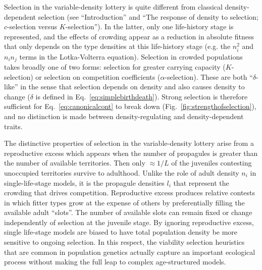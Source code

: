 \documentclass[12pt]{article}
\begin{document}
Selection in the variable-density lottery is quite different from classical density-dependent selection (see ``Introduction'' and ``The response of density to selection; $c$-selection versus $K$-selection''). In the latter, only one life-history stage is represented, and the effects of crowding appear as a reduction in absolute fitness that only depends on the type densities at this life-history stage (e.g. the $n_i^2$ and $n_in_j$ terms in the Lotka-Volterra equation). Selection in crowded populations takes broadly one of two forms: selection for greater carrying capacity ($K$-selection) or selection on competition coefficients ($\alpha$-selection). These are both ``$\delta$-like''  in the sense that selection depends on density and also causes density to change ($\delta$ is defined in Eq.~\eqref{eq:simplebirthdeath}). Strong selection is therefore sufficient for Eq.~\eqref{eq:canonicalcont} to break down (Fig.~\ref{fig:strengthofselection}), and no distinction is made between density-regulating and density-dependent traits.

The distinctive properties of selection in the variable-density lottery arise from a reproductive excess which appears when the number of propagules is greater than the number of available territories. Then only $\approx 1/L$ of the juveniles contesting unoccupied territories survive to adulthood. Unlike the role of adult density $n_i$ in single-life-stage models, it is the propagule densities $l_i$ that represent the crowding that drives competition. Reproductive excess produces relative contests in which fitter types grow at the expense of others by preferentially filling the available adult ``slots''. The number of available slots can remain fixed or change independently of selection at the juvenile stage. By ignoring reproductive excess, single life-stage models are biased to have total population density be more sensitive to ongoing selection. In this respect, the viability selection heuristics that are common in population genetics \cite[pp. 61]{gillespie_2004} actually capture an important ecological process without making the full leap to complex age-structured models.
\end{document}
